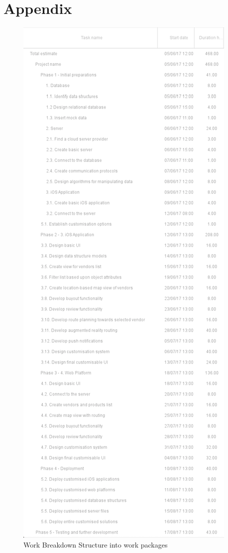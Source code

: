\section{Appendix}

\begin{figure}[!ht]
\centering
\includegraphics[scale=0.86]{img/WBS.png}
\caption{Work Breakdown Structure into work packages}
\label{fig:wbs}
\end{figure}

